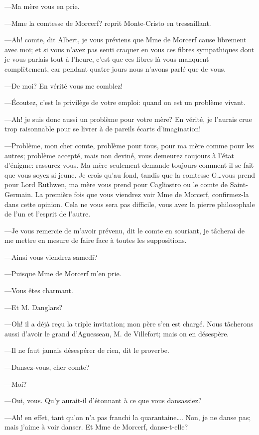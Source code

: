 —Ma mère vous en prie. 

—Mme la comtesse de Morcerf? reprit Monte-Cristo en tressaillant.  

—Ah! comte, dit Albert, je vous préviens que Mme de Morcerf cause librement avec moi; et si vous n'avez pas senti craquer en vous ces fibres sympathiques dont je vous parlais tout à l'heure, c'est que ces fibres-là vous manquent complètement, car pendant quatre jours nous n'avons parlé que de vous. 

—De moi? En vérité vous me comblez! 

—Écoutez, c'est le privilège de votre emploi: quand on est un problème vivant. 

—Ah! je suis donc aussi un problème pour votre mère? En vérité, je l'aurais crue trop raisonnable pour se livrer à de pareils écarts d'imagination! 

—Problème, mon cher comte, problème pour tous, pour ma mère comme pour les autres; problème accepté, mais non deviné, vous demeurez toujours à l'état d'énigme: rassurez-vous. Ma mère seulement demande toujours comment il se fait que vous soyez si jeune. Je crois qu'au fond, tandis que la comtesse G\dots vous prend pour Lord Ruthwen, ma mère vous prend pour Cagliostro ou le comte de Saint-Germain. La première fois que vous viendrez voir Mme de Morcerf, confirmez-la dans cette opinion. Cela ne vous sera pas difficile, vous avez la pierre philosophale de l'un et l'esprit de l'autre. 

—Je vous remercie de m'avoir prévenu, dit le comte en souriant, je tâcherai de me mettre en mesure de faire face à toutes les suppositions. 

—Ainsi vous viendrez samedi? 

—Puisque Mme de Morcerf m'en prie. 

—Vous êtes charmant. 

—Et M. Danglars? 

—Oh! il a déjà reçu la triple invitation; mon père s'en est chargé. Nous tâcherons aussi d'avoir le grand d'Aguesseau, M. de Villefort; mais on en désespère. 

—Il ne faut jamais désespérer de rien, dit le proverbe. 

—Dansez-vous, cher comte? 

—Moi? 

—Oui, vous. Qu'y aurait-il d'étonnant à ce que vous dansassiez? 

—Ah! en effet, tant qu'on n'a pas franchi la quarantaine\dots. Non, je ne danse pas; mais j'aime à voir danser. Et Mme de Morcerf, danse-t-elle? 

